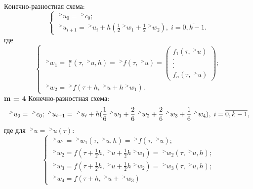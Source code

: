 \documentclass[__main__.tex]{subfiles}
\begin{document}
Конечно-разностная схема:
\begin{equation}
	\begin{cases}
	\;^>u_0 = \;^>c_0;\\
	\;^>u_{i+1} = \;^>u_i + h(\frac{1}{2}\;^>w_1 + \frac{1}{2}\;^>w_2), \; i = \overline{0, k-1}.
	\end{cases}
\end{equation}
где 
\begin{equation}
	\begin{cases}
	\;^>w_1 = \;^w_1(\tau, \;^>u, h) = \;^>f(\tau, \;^>u) =
	\begin{pmatrix}
	f_1(\tau, \;^>u)\\
	.\\
	.\\
	.\\
	f_n(\tau, \;^>u)
	\end{pmatrix};\\
	\;^>w_2 = \;^>f(\tau+h, \;^>u + h\;^>w_1).
	\end{cases}
\end{equation}
\textbf{m = 4} Конечно-разностная схема:\\
\begin{equation}
	\;^>u_0 = \;^>c_0;\\
	\;^>u_{i+1} = \;^>u_i + h(\frac{1}{6}\;^>w_1  + \frac{2}{6}\;^>w_2 + \frac{2}{6}\;^>w_3 + \frac{1}{6}\;^>w_4), \; i = \overline{0, k-1},
\end{equation}
где для $\;^>u = \;^>u(\tau):$
\begin{equation}
	\begin{cases}
	\;^>w_1 = \;^>w_1(\tau, \;^>u, h) = \;^>f(\tau, \;^>u);\\
	\;^>w_2 = f(\tau + \frac{1}{2}h, \;^>u + \frac{1}{2}h\;^>w_1) = \;^>w_2(\tau, \;^>u, h);\\
	\;^>w_3 = f(\tau + \frac{1}{2}h, \;^>u + \frac{1}{2}h\;^>w_2) = \;^>w_3(\tau, \;^>u, h);\\
	\;^>w_4 = f(\tau + h, \;^>u + \;^>w_3) 
	\end{cases}
\end{equation}
\end{document}
